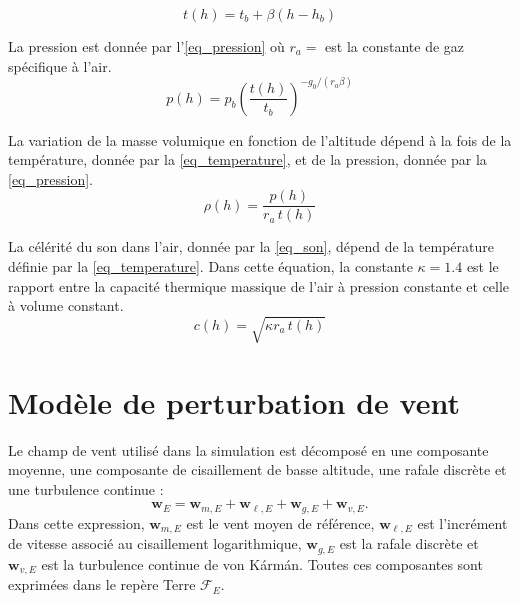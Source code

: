 \documentclass[11pt,a4paper,oneside]{report}
\newcommand{\vect}[1]{\bm{#1}}
\begin{document}
	\begin{equation}
		t(h)	= t_b+\beta (h - h_b)
		\label{eq_temperature}
	\end{equation}
	
	La pression est donnée par l'\cref{eq_pression} où \(r_a = \) est la constante de gaz spécifique à l'air.
	\begin{equation}
		p(h) = p_b\left(\frac{t(h)}{t_b}\right)^{-g_0/(r_a\beta)}
		\label{eq_pression}
	\end{equation}
	
	La variation de la masse volumique en fonction de l'altitude dépend à la fois de la température, donnée par la \cref{eq_temperature}, et de la pression, donnée par la \cref{eq_pression}. 
	\begin{equation}
		\rho(h)	= \frac{p(h)}{r_a\, t(h)}
		\label{eq_densite}
	\end{equation}
	
	La célérité du son dans l'air, donnée par la \cref{eq_son}, dépend de la température définie par la \cref{eq_temperature}. Dans cette équation, la constante \(\kappa = 1.4\) est le rapport entre la capacité thermique massique de l'air à pression constante et celle à volume constant.
	\begin{equation}
		c(h) = \sqrt{\kappa r_a \, t(h)}
		\label{eq_son}
	\end{equation}
	
	\section{Modèle de perturbation de vent}
	\label{sec_wind_disturbance_model}
	
	Le champ de vent utilisé dans la simulation est décomposé en une composante moyenne, une composante de cisaillement de basse altitude, une rafale discrète et une turbulence continue :
	\begin{equation}
		\vect w_E
		=
		\vect w_{m,E}
		+
		\vect w_{\ell,E}
		+
		\vect w_{g,E}
		+
		\vect w_{v,E}.
		\label{eq_wind_sum}
	\end{equation}
	Dans cette expression, $\vect w_{m,E}$ est le vent moyen de référence, $\vect w_{\ell,E}$ est l'incrément de vitesse associé au cisaillement logarithmique, $\vect w_{g,E}$ est la rafale discrète et $\vect w_{v,E}$ est la turbulence continue de von Kármán. Toutes ces composantes sont exprimées dans le repère Terre $\mathcal F_E$.
	
\end{document}
